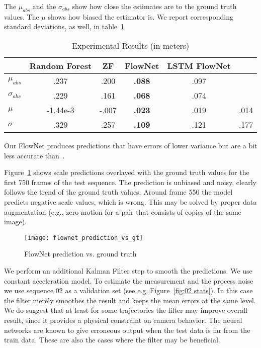 The $\mu_{abs}$ and the $\sigma_{abs}$ show how close the estimates
are to the ground truth values.  The $\mu$ shows how biased the
estimator is.  We report corresponding standard deviations, as well,
in table~\ref{table:main result}

\begin{table}[ht]
  \centering
  \begin{tabular}{ lccccc }
    \hline
                       & Random Forest & ZF   & FlowNet          & LSTM FlowNet & \cite{frost2016}   \\
    \hline
    $\mu_{abs}$        & .237          & .200 & \textbf{.088}    & .097  & \\
    $\sigma_{abs}$     & .229          & .161 & \textbf{.068}    & .074  & \\
    $\mu$              & -1.44e-3      &-.007 & \textbf{.023}    & .019  & .014\\
    $\sigma$           & .329          & .257 & \textbf{.109}    & .121  & .177\\
    \hline
  \end{tabular}
  \caption{Experimental Results (in meters)}
  \label{table:main result}
\end{table}

Our FlowNet produces predictions that have errors of lower variance
but are a bit less accurate than~\cite{frost2017using}.

Figure~\ref{fig:pred_vs_gt} shows scale predictions overlayed with the
ground truth values for the first 750 frames of the test sequence.
The prediction is unbiased and noisy, clearly follows the trend of the
ground truth values.  Around frame 550 the model predicts negative
scale values, which is wrong.  This may be solved by proper data
augmentation (e.g., zero motion for a pair that consists of copies of
the same image).

\begin{figure}[!ht]
  \centering
  \texttt{[image: flownet\_prediction\_vs\_gt]}
  \caption{FlowNet prediction vs. ground truth}
  \label{fig:pred_vs_gt}
\end{figure}

We perform an additional Kalman Filter step to smooth the predictions.
We use constant acceleration model.  To estimate the measurement and
the process noise we use sequence 02 as a validation set (see
e.g.,Figure~\ref{fig:02 stats}).  In this case the filter merely
smoothes the result and keeps the mean errors at the same level.  We
do suggest that at least for some trajectories the filter may improve
overall result, since it provides a physical constraint on camera
behavior.  The neural networks are known to give erroneous output when
the test data is far from the train data.  These are also the cases
where the filter may be beneficial.

